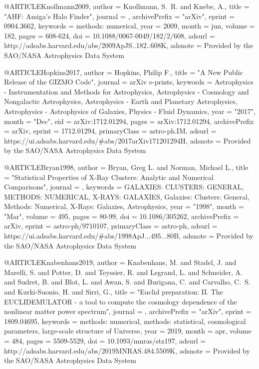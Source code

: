 {@ARTICLE{Knollmann2009,
   author = {{Knollmann}, S.~R. and {Knebe}, A.},
    title = "{AHF: Amiga's Halo Finder}",
  journal = {\apjs},
archivePrefix = "arXiv",
   eprint = {0904.3662},
 keywords = {methods: numerical},
     year = 2009,
    month = jun,
   volume = 182,
    pages = {608-624},
      doi = {10.1088/0067-0049/182/2/608},
   adsurl = {http://adsabs.harvard.edu/abs/2009ApJS..182..608K},
  adsnote = {Provided by the SAO/NASA Astrophysics Data System}
}

@ARTICLE{Hopkins2017,
       author = {{Hopkins}, Philip F.},
        title = "{A New Public Release of the GIZMO Code}",
      journal = {arXiv e-prints},
     keywords = {Astrophysics - Instrumentation and Methods for Astrophysics, Astrophysics - Cosmology and Nongalactic Astrophysics, Astrophysics - Earth and Planetary Astrophysics, Astrophysics - Astrophysics of Galaxies, Physics - Fluid Dynamics},
         year = "2017",
        month = "Dec",
          eid = {arXiv:1712.01294},
        pages = {arXiv:1712.01294},
archivePrefix = {arXiv},
       eprint = {1712.01294},
 primaryClass = {astro-ph.IM},
       adsurl = {https://ui.adsabs.harvard.edu/\#abs/2017arXiv171201294H},
      adsnote = {Provided by the SAO/NASA Astrophysics Data System}
}

@ARTICLE{Bryan1998,
       author = {{Bryan}, Greg L. and {Norman}, Michael L.},
        title = "{Statistical Properties of X-Ray Clusters: Analytic and Numerical Comparisons}",
      journal = {\apj},
     keywords = {GALAXIES: CLUSTERS: GENERAL, METHODS: NUMERICAL, X-RAYS: GALAXIES, Galaxies: Clusters: General, Methods: Numerical, X-Rays: Galaxies, Astrophysics},
         year = "1998",
        month = "Mar",
       volume = {495},
        pages = {80-99},
          doi = {10.1086/305262},
archivePrefix = {arXiv},
       eprint = {astro-ph/9710107},
 primaryClass = {astro-ph},
       adsurl = {https://ui.adsabs.harvard.edu/\#abs/1998ApJ...495...80B},
      adsnote = {Provided by the SAO/NASA Astrophysics Data System}
}


@ARTICLE{Knabenhans2019,
   author = {{Knabenhans}, M. and {Stadel}, J. and {Marelli}, S. and {Potter}, D. and 
	{Teyssier}, R. and {Legrand}, L. and {Schneider}, A. and {Sudret}, B. and 
	{Blot}, L. and {Awan}, S. and {Burigana}, C. and {Carvalho}, C.~S. and 
	{Kurki-Suonio}, H. and {Sirri}, G.},
    title = "{Euclid preparation: II. The EUCLIDEMULATOR - a tool to compute the cosmology dependence of the nonlinear matter power spectrum}",
  journal = {\mnras},
archivePrefix = "arXiv",
   eprint = {1809.04695},
 keywords = {methods: numerical, methods: statistical, cosmological parameters, large-scale structure of Universe},
     year = 2019,
    month = apr,
   volume = 484,
    pages = {5509-5529},
      doi = {10.1093/mnras/stz197},
   adsurl = {http://adsabs.harvard.edu/abs/2019MNRAS.484.5509K},
  adsnote = {Provided by the SAO/NASA Astrophysics Data System}
}

}
